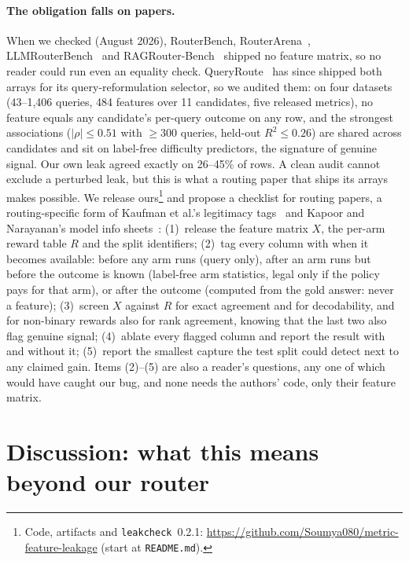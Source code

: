 \documentclass{article}
\begin{document}
\paragraph{The obligation falls on papers.} When we checked (August 2026), RouterBench,
RouterArena~\cite{routerarena2026}, LLMRouterBench~\cite{llmrouterbench2026} and
RAGRouter-Bench~\cite{bansal2026ragrouter} shipped no feature matrix, so no reader could run even
an equality check. QueryRoute~\cite{le2026queryroute} has since shipped both arrays for its
query-reformulation selector, so we audited them: on four datasets (43--1{,}406 queries, 484
features over 11 candidates, five released metrics), no feature equals any candidate's per-query
outcome on any row, and the strongest associations ($|\rho|{\le}0.51$ with ${\ge}300$ queries,
held-out $R^2{\le}0.26$) are shared across candidates and sit on label-free difficulty predictors,
the signature of genuine signal. Our own leak agreed exactly on 26--45\% of rows. A clean audit
cannot exclude a perturbed leak, but this is what a routing paper that ships its arrays makes
possible. We release ours\footnote{Code, artifacts and \texttt{leakcheck}~0.2.1: \url{https://github.com/Soumya080/metric-feature-leakage} (start at \texttt{README.md}).}
and propose a checklist for routing papers, a routing-specific form of Kaufman et al.'s
legitimacy tags~\cite{kaufman2012leakage} and Kapoor and Narayanan's model info
sheets~\cite{kapoor2023leakage}: (1)~release the feature matrix $X$, the per-arm reward table
$R$ and the split identifiers; (2)~tag every column with when it becomes available: before any
arm runs (query only), after an arm runs but before the outcome is known (label-free arm
statistics, legal only if the policy pays for that arm), or after the outcome (computed from the
gold answer: never a feature); (3)~screen $X$ against $R$ for exact agreement and for
decodability, and for non-binary rewards also for rank agreement, knowing that the last two also
flag genuine signal; (4)~ablate every flagged column and report the result with and without it;
(5)~report the smallest capture the test split could detect next to any claimed gain. Items
(2)--(5) are also a reader's questions, any one of which would have caught our bug, and none needs
the authors' code, only their feature matrix.

\section{Discussion: what this means beyond our router}
\label{sec:discussion}
\end{document}
